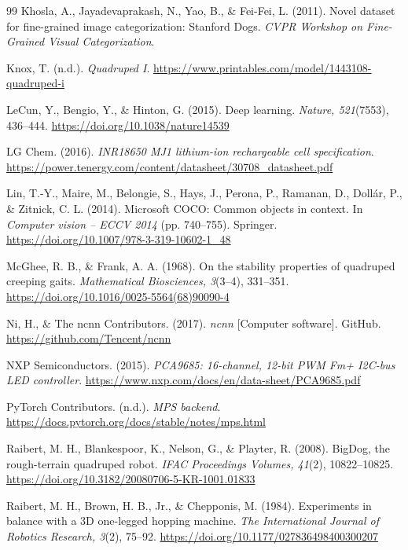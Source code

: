 \documentclass[a4paper,12pt]{report}
\begin{document}
\begin{thebibliography}{99}
Khosla, A., Jayadevaprakash, N., Yao, B., \& Fei-Fei, L. (2011).
Novel dataset for fine-grained image categorization: Stanford Dogs.
\textit{CVPR Workshop on Fine-Grained Visual Categorization}.

Knox, T. (n.d.). \textit{Quadruped I}.
\url{https://www.printables.com/model/1443108-quadruped-i}

LeCun, Y., Bengio, Y., \& Hinton, G. (2015).
Deep learning. \textit{Nature, 521}(7553), 436--444.
\url{https://doi.org/10.1038/nature14539}

LG Chem. (2016). \textit{INR18650 MJ1 lithium-ion rechargeable cell specification}.
\url{https://power.tenergy.com/content/datasheet/30708_datasheet.pdf}

Lin, T.-Y., Maire, M., Belongie, S., Hays, J., Perona, P., Ramanan, D., Dollár, P., \&
Zitnick, C. L. (2014). Microsoft COCO: Common objects in context.
In \textit{Computer vision -- ECCV 2014} (pp. 740--755). Springer.
\url{https://doi.org/10.1007/978-3-319-10602-1_48}

McGhee, R. B., \& Frank, A. A. (1968).
On the stability properties of quadruped creeping gaits.
\textit{Mathematical Biosciences, 3}(3--4), 331--351.
\url{https://doi.org/10.1016/0025-5564(68)90090-4}

Ni, H., \& The ncnn Contributors. (2017).
\textit{ncnn} [Computer software]. GitHub.
\url{https://github.com/Tencent/ncnn}

NXP Semiconductors. (2015).
\textit{PCA9685: 16-channel, 12-bit PWM Fm+ I2C-bus LED controller}.
\url{https://www.nxp.com/docs/en/data-sheet/PCA9685.pdf}

PyTorch Contributors. (n.d.).
\textit{MPS backend}.
\url{https://docs.pytorch.org/docs/stable/notes/mps.html}

Raibert, M. H., Blankespoor, K., Nelson, G., \& Playter, R. (2008).
BigDog, the rough-terrain quadruped robot.
\textit{IFAC Proceedings Volumes, 41}(2), 10822--10825.
\url{https://doi.org/10.3182/20080706-5-KR-1001.01833}

Raibert, M. H., Brown, H. B., Jr., \& Chepponis, M. (1984).
Experiments in balance with a 3D one-legged hopping machine.
\textit{The International Journal of Robotics Research, 3}(2), 75--92.
\url{https://doi.org/10.1177/027836498400300207}


\end{thebibliography}
\end{document}
